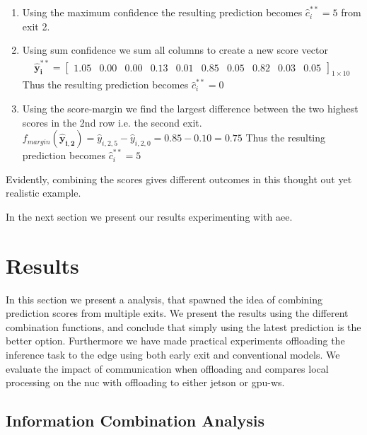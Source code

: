 {\begin{enumerate}
		\item 	Using the maximum confidence the resulting prediction becomes $ \hat{c}^{**}_{i} =  5$ from exit 2.
		\item 	Using sum confidence we sum all columns to create a new score vector
		\begin{align*}
		\bm{\hat{y}^{**}_{i}} = 
		\begin{bmatrix}
		1.05 & 0.00 & 0.00 & 0.13 & 0.01 & 0.85 & 0.05 & 0.82 & 0.03 & 0.05
		\end{bmatrix}_{1 \times 10}
		\end{align*}
		Thus the resulting prediction becomes $ \hat{c}^{**}_{i} = 0$
		\item Using the score-margin we find the largest difference between the two highest scores in the 2nd row i.e. the second exit. $ f_{margin}\left(\bm{\hat{y}_{i,2}}\right) = \hat{y}_{i,2,5} - \hat{y}_{i,2,0} = 0.85 - 0.10 =0.75 $ Thus the resulting prediction becomes $ \hat{c}^{**}_i = 5$
	\end{enumerate}
	Evidently, combining the scores gives different outcomes in this thought out yet realistic example.
	
}

In the next section we present our results experimenting with \gls{aee}.

\section{Results} \label{sec:edge-results}

In this section we present a analysis, that spawned the idea of combining prediction scores from multiple exits. We present the results using the different combination functions, and conclude that simply using the latest prediction is the better option. Furthermore we have made practical experiments offloading the inference task to the edge using both early exit and conventional models. We evaluate the impact of communication when offloading and compares local processing on the \gls{nuc} with offloading to either \gls{jetson} or \gls{gpu-ws}.

\subsection{Information Combination Analysis}

